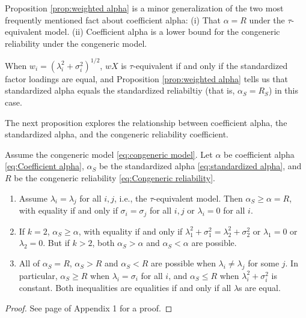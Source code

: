 \documentclass[twoside]{article}
\renewcommand{\sqrt}[1]{{(#1)^{1/2}}}
\begin{document}

Proposition \ref{prop:weighted alpha} is a minor generalization of the two most frequently mentioned fact about coefficient alpha: (i) That $\alpha =  R$ under the $\tau$-equivalent model. (ii) Coefficient alpha is a lower bound for the congeneric reliability under the congeneric model.
 
When $w_{i}=\sqrt{\lambda_{i}^{2}+\sigma_{i}^{2}}$, $wX$ is $\tau$-equivalent if and only if the standardized factor loadings are equal, and Proposition \ref{prop:weighted alpha} tells us that standardized alpha equals the standardized reliabiltiy (that is, $\alpha_S =  R_S$) in this case. 

The next proposition explores the relationship between coefficient alpha, the standardized alpha, and the congeneric reliability coefficient.

\begin{prop}
\label{prop:Reliabilities.}Assume the congeneric model \eqref{eq:congeneric model}. Let $\alpha$ be coefficient alpha \eqref{eq:Coefficient alpha}, $\alpha_S$ be the standardized alpha \eqref{eq:standardized alpha}, and  $ R$ be the congeneric reliability \eqref{eq:Congeneric reliability}. 
\begin{enumerate}[label=(\roman*)]
\item Assume $\lambda_{i}=\lambda_{j}$ for all $i,j$, i.e., the $\tau$-equivalent model. Then $\alpha_S \geq \alpha =  R$, with equality if and only if $\sigma_{i}=\sigma_{j}$ for all $i,j$ or $\lambda_i = 0$ for all $i$.
\item If $k=2$, $\alpha_S\geq\alpha$, with equality if and only if $\lambda_{1}^{2}+\sigma_{1}^{2}=\lambda_{2}^{2}+\sigma_{2}^{2}$ or $\lambda_1 = 0$ or $\lambda_2 = 0$. But if $k>2$, both $\alpha_S>\alpha$
and $\alpha_S<\alpha$ are possible.
\item All of $\alpha_S= R$, $\alpha_S> R$ and $\alpha_S< R$
are possible when $\lambda_{i}\neq\lambda_{j}$ for some $j$. In particular, $\alpha_S \geq  R$ when $\lambda_i = \sigma_i$ for all $i$, and $\alpha_S \leq  R$ when $\lambda_i^2 + \sigma_i^2$ is constant. Both inequalities are equalities if and only if all $\lambda$s are equal.
\end{enumerate}
\end{prop}
\begin{proof}
See page \pageref{proof:Reliabilities.} of Appendix 1 for a proof.
\end{proof}
\end{document}
